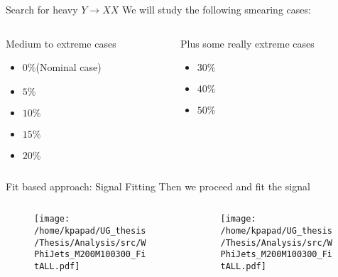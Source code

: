 \documentclass[bigger]{beamer}
\begin{document}
\begin{frame}[label={sec:orga73f1ce}]{Search for heavy \(Y \rightarrow XX\)}
We will study the following smearing cases:\newline
\begin{columns}
\begin{column}{0.5\columnwidth}
Medium to extreme cases 
\begin{itemize}
\item \(0\%\)(Nominal case)
\item \(5\%\)
\item \(10\%\)
\item \(15\%\)
\item \(20\%\)
\end{itemize}
\end{column}
\begin{column}{0.5\columnwidth}
Plus some really extreme cases
\begin{itemize}
\item \(30\%\)
\item \(40\%\)
\item \(50\%\)
\end{itemize}
\end{column}
\end{columns}
\end{frame}



\begin{frame}[label={sec:org11394ca}]{Fit based approach: Signal Fitting}
Then we proceed and fit the signal
\begin{columns}
\begin{column}{0.5\columnwidth}
\begin{figure}[h]
\centering
\texttt{[image: /home/kpapad/UG\_thesis/Thesis/Analysis/src/WPhiJets\_M200M100300\_FitALL.pdf]}
\end{figure}
\end{column}

\begin{column}{0.5\columnwidth}
\begin{figure}[h]
\centering
\texttt{[image: /home/kpapad/UG\_thesis/Thesis/Analysis/src/WPhiJets\_M200M100300\_FitALL.pdf]}
\end{figure}
\end{column}
\end{columns}
\end{frame}
\end{document}
